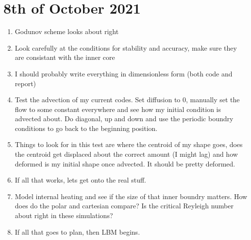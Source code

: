 \documentclass{article}
\begin{document}
\section*{8th of October 2021}
\begin{enumerate}
	\item Godunov scheme looks about right
	\item Look carefully at the conditions for stability and accuracy, make sure they are consistant with the inner core
	\item I should probably write everything in dimensionless form (both code and report)
	\item Test the advection of my current codes. Set diffusion to 0, manually set the flow to some constant everywhere 
	and see how my initial condition is advected about. Do diagonal, up and down and use the periodic boundry conditions 
	to go back to the beginning position.
	\item Things to look for in this test are where the centroid of my shape goes, does the centroid get displaced about the correct amount (I might lag) and how deformed is my initial shape once advected. It should be pretty deformed.
	\item If all that works, lets get onto the real stuff. 
	\item Model internal heating and see if the size of that inner boundry matters. How does do the polar and cartesian compare? Is the critical Reyleigh number about right in these simulations? 
	\item If all that goes to plan, then LBM begins.
\end{enumerate}

\newpage
\end{document}
